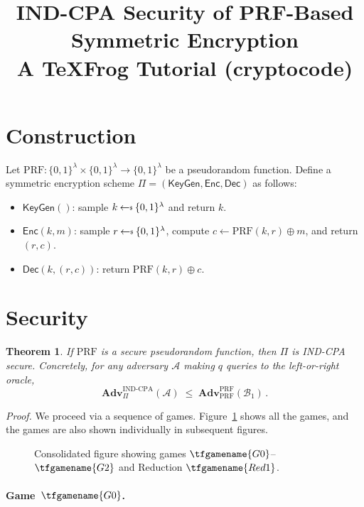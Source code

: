 \documentclass{article}
\title{IND-CPA Security of PRF-Based Symmetric Encryption\\
{\large A TeXFrog Tutorial (cryptocode)}}
\author{}
\date{}
\newtheorem{theorem}{Theorem}
\begin{document}
\maketitle

\section{Construction}

Let $\mathrm{PRF}\colon \{0,1\}^\lambda \times \{0,1\}^\lambda \to \{0,1\}^\lambda$
be a pseudorandom function.
Define a symmetric encryption scheme $\Pi = (\mathsf{KeyGen}, \mathsf{Enc}, \mathsf{Dec})$ as follows:
\begin{itemize}
  \item $\mathsf{KeyGen}()$: sample $k \getsr \{0,1\}^\lambda$ and return $k$.
  \item $\mathsf{Enc}(k, m)$: sample $r \getsr \{0,1\}^\lambda$, compute
    $c \gets \mathrm{PRF}(k, r) \oplus m$, and return $(r, c)$.
  \item $\mathsf{Dec}(k, (r, c))$: return $\mathrm{PRF}(k, r) \oplus c$.
\end{itemize}

\section{Security}

\begin{theorem}
If\/ $\mathrm{PRF}$ is a secure pseudorandom function, then $\Pi$ is IND-CPA secure.
Concretely, for any adversary $\mathcal{A}$ making $q$ queries to the
left-or-right oracle,
\[
  \mathbf{Adv}^{\mathrm{IND\text{-}CPA}}_\Pi(\mathcal{A})
  \;\leq\;
  \mathbf{Adv}^{\mathrm{PRF}}_{\mathrm{PRF}}(\mathcal{B}_1) \,.
\]
\end{theorem}

\noindent\textit{Proof.}\quad
We proceed via a sequence of games. Figure~\ref{fig:all-games} shows all the games, and the games are also shown individually in subsequent figures.

\begin{figure}[ht]
\centering

\caption{Consolidated figure showing games $\tfgamename{G0}$--$\tfgamename{G2}$ and Reduction $\tfgamename{Red1}$.}
\label{fig:all-games}
\end{figure}

\paragraph{Game~$\tfgamename{G0}$.}

\end{document}
